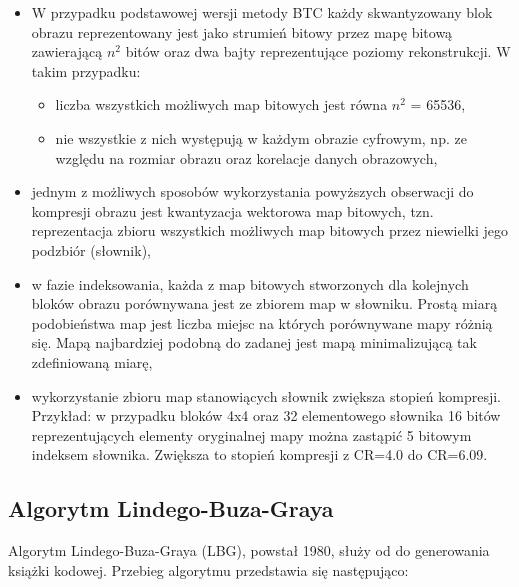 \documentclass{article}
\begin{document}
\begin{itemize} 
\item W przypadku podstawowej wersji metody BTC każdy skwantyzowany blok obrazu reprezentowany jest jako strumień bitowy przez mapę bitową zawierającą $n^{2}$ bitów oraz dwa bajty reprezentujące poziomy rekonstrukcji. W takim przypadku:
     \begin{itemize}[label=$\star$]
        \item liczba wszystkich możliwych map bitowych jest równa $n^{2}$ = 65536,
        \item nie wszystkie z nich występują w każdym obrazie cyfrowym, np. ze względu na rozmiar obrazu oraz korelacje danych obrazowych, 
     \end{itemize}
\item jednym z możliwych sposobów wykorzystania powyższych obserwacji do kompresji obrazu jest kwantyzacja wektorowa map bitowych, tzn. reprezentacja zbioru wszystkich możliwych map bitowych przez niewielki jego podzbiór (słownik),
\item w fazie indeksowania, każda z map bitowych stworzonych dla kolejnych bloków obrazu porównywana jest ze zbiorem map w słowniku. Prostą miarą podobieństwa map jest liczba miejsc na których porównywane mapy różnią się. Mapą najbardziej podobną do zadanej jest mapą minimalizującą tak zdefiniowaną miarę,
\item wykorzystanie zbioru map stanowiących słownik zwiększa stopień kompresji. Przykład: w przypadku bloków 4x4 oraz 32 elementowego słownika 16 bitów reprezentujących elementy oryginalnej mapy można zastąpić 5 bitowym indeksem słownika. Zwiększa to stopień kompresji z CR=4.0 do CR=6.09.
\end{itemize}

\subsection{Algorytm Lindego-Buza-Graya}

Algorytm Lindego-Buza-Graya (LBG), powstał 1980, służy od do generowania książki kodowej. Przebieg algorytmu przedstawia się następująco:
\end{document}
